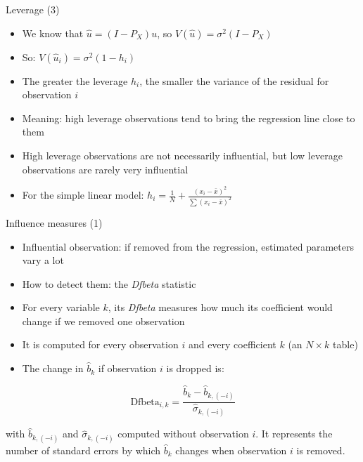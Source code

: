 \documentclass[aspectratio=169]{beamer}
\begin{document}
\begin{frame}{Leverage (3)}
\begin{itemize}
    \item We know that $\hat{u} = (I - P_X)u$, so $V(\hat{u}) = \sigma^2(I - P_X)$
    \item So: $V(\hat{u}_i) = \sigma^2(1 - h_i)$
    \item The greater the leverage $h_i$, the smaller the variance of the residual for observation $i$
    \item Meaning: high leverage observations tend to bring the regression line close to them
    \item High leverage observations are not necessarily influential, but low leverage observations are rarely very influential
    \item For the simple linear model: $h_i = \frac{1}{N} + \frac{(x_i-\bar{x})^2}{\sum(x_i-\bar{x})^2}$
\end{itemize}
\end{frame}

\begin{frame}{Influence measures (1)}
\begin{itemize}
    \item Influential observation: if removed from the regression, estimated parameters vary a lot
    \item How to detect them: the \textit{Dfbeta} statistic
    \item For every variable $k$, its \textit{Dfbeta} measures how much its coefficient would change if we removed one observation
    \item It is computed for every observation $i$ and every coefficient $k$ (an $N \times k$ table)
    \item The change in $\hat{b}_k$ if observation $i$ is dropped is:
\end{itemize}

\[\text{Dfbeta}_{i,k} = \frac{\hat{b}_k - \hat{b}_{k,(-i)}}{\hat{\sigma}_{k,(-i)}}\]

with $\hat{b}_{k,(-i)}$ and $\hat{\sigma}_{k,(-i)}$ computed without observation $i$. It represents the number of standard errors by which $\hat{b}_k$ changes when observation $i$ is removed.
\end{frame}
\end{document}
